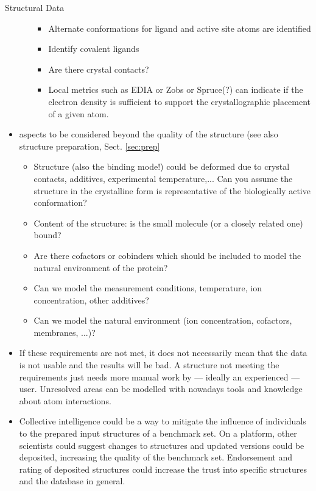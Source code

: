 \documentclass[9pt,bestpractices]{livecoms}
\begin{document}
\begin{Checklists*}[p!]
\begin{checklist}{Structural Data}
\begin{itemize}
\begin{itemize}
\begin{itemize}
        \item Alternate conformations for ligand and active site atoms are identified
        \item Identify covalent ligands
        \item Are there crystal contacts? 
        \item  Local metrics such as EDIA or Zobs or Spruce(?) can indicate if the electron density is sufficient to support the crystallographic placement of a given atom.
        \end{itemize}
    \end{itemize}
\item aspects to be considered beyond the quality of the structure (see also structure preparation, Sect. \ref{sec:prep}
    \begin{itemize}
    \item Structure (also the binding mode!) could be deformed due to crystal contacts, additives, experimental temperature,... Can you assume the structure in the crystalline form is representative of the biologically active conformation? 
    \item Content of the structure: is the small molecule (or a closely related one) bound? 
    \item Are there cofactors or cobinders which should be included to model the natural environment of the protein?
    \item Can we model the measurement conditions, temperature, ion concentration, other additives?
    \item Can we model the natural environment (ion concentration, cofactors, membranes, ...)?
    \end{itemize}
\item If these requirements are not met, it does not necessarily mean that the data is not usable and  the results will be bad. A structure not meeting the requirements just needs more manual work by --- ideally an experienced --- user. Unresolved areas can be modelled with nowadays tools and knowledge about atom interactions.
\item Collective intelligence could be a way to mitigate the influence of individuals to the prepared input structures of a benchmark set. On a platform, other scientists could suggest changes to structures and updated versions could be deposited, increasing the quality of the benchmark set. Endorsement and rating of deposited structures could increase the trust into specific structures and the database in general. 
\end{itemize}
\end{checklist}

\end{Checklists*}
\end{document}
